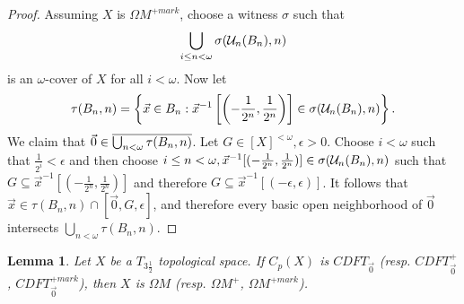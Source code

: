 \documentclass{amsart}
\theoremstyle{plain}
\newtheorem{lemma}[theorem]{Lemma}
\theoremstyle{definition}
\theoremstyle{remark}
\theoremstyle{plain}
\theoremstyle{definition}
\theoremstyle{remark}
\begin{document}
\begin{proof}
  Assuming \(X\) is \(\Omega M^{+mark}\), choose a witness
  \(\sigma\) such that
  \[
    \bigcup_{i\leq n<\omega} \sigma(\mathcal{U}_n(B_n),n)
  \]
  is an \(\omega\)-cover of \(X\) for all \(i<\omega\).
  Now let
  \[
    \tau(B_n,n)
      =
    \left\{
      \vec x\in B_n
    :
      \vec x^{-1}\left[\left(-\frac{1}{2^n},\frac{1}{2^n}\right)\right]
        \in
      \sigma(\mathcal{U}_n(B_n),n)
    \right\}
  .\]
  We claim that \(\vec 0\in\overline{\bigcup_{n<\omega}\tau(B_n,n)}\).
  Let \(G\in[X]^{<\omega},\epsilon>0\). Choose \(i<\omega\) such that
  \(\frac{1}{2^i}<\epsilon\) and then choose
  \(i\leq n<\omega,\vec x^{-1}[(-\frac{1}{2^n},\frac{1}{2^n})]\in\sigma(\mathcal{U}_n(B_n),n)\)
  such that \(G\subseteq \vec x^{-1}[(-\frac{1}{2^n},\frac{1}{2^n})]\)
  and therefore \(G\subseteq \vec x^{-1}[(-\epsilon,\epsilon)]\).
  It follows that \(\vec x\in \tau(B_n,n)\cap[\vec 0,G,\epsilon]\), and therefore
  every basic open neighborhood of \(\vec 0\) intersects
  \(\bigcup_{n<\omega}\tau(B_n,n)\).
\end{proof}

\begin{lemma}
  Let \(X\) be a \(T_{3\frac{1}{2}}\) topological space.
  If \(C_p(X)\) is \(CDFT_{\vec 0}\)
  (resp. \(CDFT_{\vec 0}^+\), \(CDFT_{\vec 0}^{+mark}\)),
  then \(X\) is \(\Omega M\)
  (resp. \(\Omega M^+\), \(\Omega M^{+mark}\)).
\end{lemma}
\end{document}

